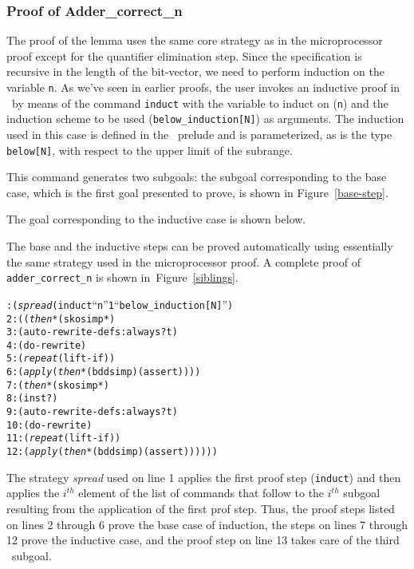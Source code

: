 \subsubsection{Proof of Adder\_correct\_n}
The proof of the lemma uses the same core strategy as in the
microprocessor proof except for the quantifier elimination step.
Since the specification is recursive in the length of the bit-vector,
we need to perform induction on the variable {\tt n}. As we've seen
in earlier proofs,
the user invokes an inductive proof in \pvs\ by means of the command
{\tt induct} with the variable to induct on ({\tt n}) and the induction
scheme to be used ({\tt below\_induction[N]}) as arguments.
The induction used in this case is defined in the \pvs\ prelude and
is parameterized, as is the type {\tt below[N]}, with respect to
the upper limit of the subrange.

This command  generates two subgoals:
the subgoal corresponding to the base case, which is the first goal presented
to prove, is shown in Figure~\ref{base-step}.


The goal corresponding to the inductive case is shown below.


The base and the inductive steps can be proved automatically
using essentially the same strategy used in the microprocessor proof.
A complete proof of {\tt adder\_correct\_n} is shown in~Figure~\ref{siblings}.

\begin{alltt}
{\smaller{}: ({\em spread} (induct ``n'' 1 ``below_induction[N]'')
 2:   ( ({\em then*}  (skosimp*)
 3:              (auto-rewrite-defs :always? t)
 4:              (do-rewrite)
 5:              ({\em repeat} (lift-if))
 6:              ({\em apply} ({\em then*} (bddsimp)(assert))))
 7:     ({\em then*} (skosimp*)
 8:             (inst?)
 9:             (auto-rewrite-defs :always? t)
10:             (do-rewrite)
11:             ({\em repeat} (lift-if))
12:             ({\em apply} ({\em then*} (bddsimp)(assert))))))
}
\end{alltt}

The strategy {\em spread} used on line 1 applies the first proof step
({\tt induct})
and then applies the $i^{th}$ element of the list of commands that follow
to the $i^{th}$ subgoal resulting from the application of the first prof step.
Thus, the proof steps listed on lines 2 through 6 prove the base case
of induction, the steps on lines 7 through 12 prove the inductive case, and
the proof step on line 13 takes care of the third \tcc\ subgoal.

